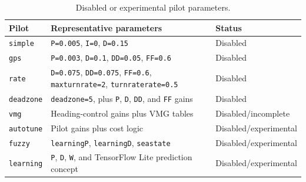 \documentclass[10pt,twocolumn]{article}
\begin{document}
\begin{table}[!tbp]
\centering
\caption{Disabled or experimental pilot parameters.}
\label{tab:pypilot-disabled-pilots}
\begin{tabularx}{\textwidth}{Z{0.16\textwidth}Z{0.56\textwidth}Z{0.24\textwidth}}
\toprule
Pilot & Representative parameters & Status \\
\midrule
\texttt{simple} &
\texttt{P=0.005}, \texttt{I=0}, \texttt{D=0.15} &
Disabled \\
\texttt{gps} &
\texttt{P=0.003}, \texttt{D=0.1}, \texttt{DD=0.05}, \texttt{FF=0.6} &
Disabled \\
\texttt{rate} &
\texttt{D=0.075}, \texttt{DD=0.075}, \texttt{FF=0.6},
\texttt{maxturnrate=2}, \texttt{turnraterate=0.5} &
Disabled \\
\texttt{deadzone} &
\texttt{deadzone=5}, plus \texttt{P}, \texttt{D}, \texttt{DD}, and
\texttt{FF} gains &
Disabled \\
\texttt{vmg} &
Heading-control gains plus VMG tables &
Disabled/incomplete \\
\texttt{autotune} &
Pilot gains plus cost logic &
Disabled/experimental \\
\texttt{fuzzy} &
\texttt{learningP}, \texttt{learningD}, \texttt{seastate} &
Disabled/experimental \\
\texttt{learning} &
\texttt{P}, \texttt{D}, \texttt{W}, and TensorFlow Lite prediction concept &
Disabled/experimental \\
\bottomrule
\end{tabularx}
\end{table}
\end{document}
